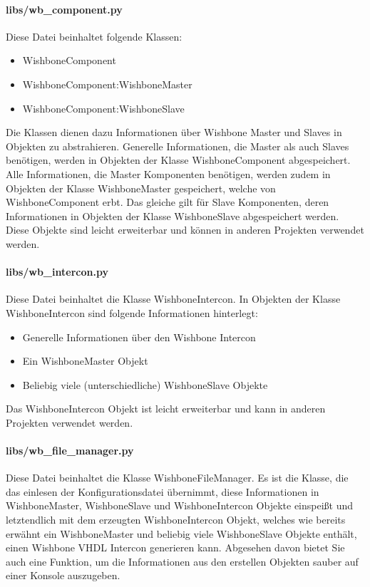 \documentclass{article}
\newcommand{\nl}{\leavevmode\newline}
\begin{document}
\paragraph{libs/wb\_component.py}\nl
Diese Datei beinhaltet folgende Klassen:
\begin{itemize}
\item WishboneComponent
\item WishboneComponent:WishboneMaster
\item WishboneComponent:WishboneSlave
\end{itemize}
Die Klassen dienen dazu Informationen über Wishbone Master und Slaves in Objekten zu abstrahieren.
Generelle Informationen, die Master als auch Slaves benötigen, werden in Objekten der Klasse WishboneComponent abgespeichert. Alle Informationen, die Master Komponenten benötigen, werden zudem in Objekten der Klasse WishboneMaster gespeichert, welche von WishboneComponent erbt. Das gleiche gilt für Slave Komponenten, deren Informationen in Objekten der Klasse WishboneSlave abgespeichert werden. Diese Objekte sind leicht erweiterbar und können in anderen Projekten verwendet werden.
\paragraph{libs/wb\_intercon.py}\nl
Diese Datei beinhaltet die Klasse WishboneIntercon. In Objekten der Klasse WishboneIntercon sind folgende Informationen hinterlegt:
\begin{itemize}
\item Generelle Informationen über den Wishbone Intercon
\item Ein WishboneMaster Objekt
\item Beliebig viele (unterschiedliche) WishboneSlave Objekte
\end{itemize}
Das WishboneIntercon Objekt ist leicht erweiterbar und kann in anderen Projekten verwendet werden.
\paragraph{libs/wb\_file\_manager.py}\nl 
Diese Datei beinhaltet die Klasse WishboneFileManager. Es ist die Klasse, die das einlesen der Konfigurationsdatei übernimmt, diese Informationen in WishboneMaster, WishboneSlave und WishboneIntercon Objekte einspeißt und letztendlich mit dem erzeugten WishboneIntercon Objekt, welches wie bereits erwähnt ein WishboneMaster und beliebig viele WishboneSlave Objekte enthält, einen Wishbone VHDL Intercon generieren kann. Abgesehen davon bietet Sie auch eine Funktion, um die Informationen aus den erstellen Objekten sauber auf einer Konsole auszugeben.
\end{document}
